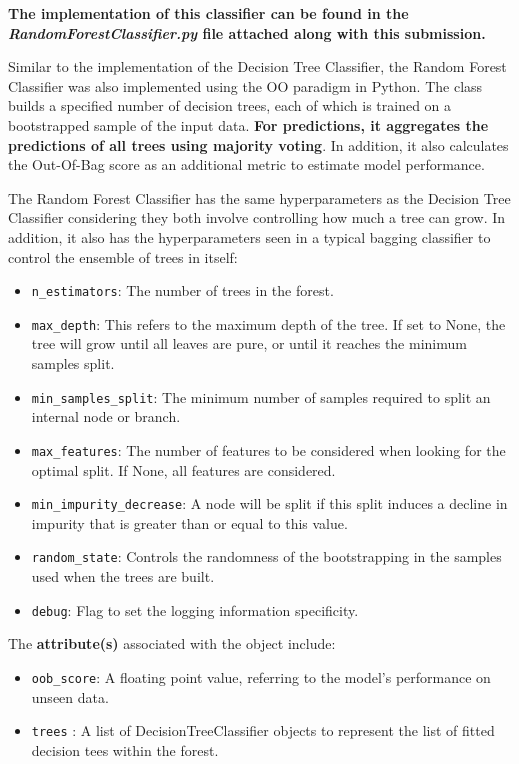 \begin{appendices}
  \textbf{The implementation of this classifier can be found in the \textit{RandomForestClassifier.py} file attached along with this submission.}

  Similar to the implementation of the Decision Tree Classifier, the Random Forest Classifier was also implemented using the OO paradigm in Python. The class builds a specified number of decision trees, each of which is trained on a bootstrapped sample of the input data.
  \textbf{For predictions, it aggregates the predictions of all trees using majority voting}.
  In addition, it also calculates the Out-Of-Bag score as an additional metric to estimate model performance.

  The Random Forest Classifier has the same hyperparameters as the Decision Tree Classifier considering they both involve controlling how much a tree can grow. In addition, it also has the hyperparameters seen in a typical bagging classifier to control the ensemble of trees in itself:
  \begin{itemize}
    \item \texttt{n\_estimators}: The number of trees in the forest.
    \item \texttt{max\_depth}: This refers to the maximum depth of the tree. If set to None, the tree will grow until all leaves are pure, or until it reaches the minimum samples split.
    \item \texttt{min\_samples\_split}: The minimum number of samples required to split an internal node or branch.
    \item \texttt{max\_features}: The number of features to be considered when looking for the optimal split. If None, all features are considered.
    \item \texttt{min\_impurity\_decrease}: A node will be split if this split induces a decline in impurity that is greater than or equal to this value.
    \item \texttt{random\_state}: Controls the randomness of the bootstrapping in the samples used when the trees are built.
    \item \texttt{debug}: Flag to set the logging information specificity.
  \end{itemize}

  The \textbf{attribute(s)} associated with the object include:
  \begin{itemize}
    \item \texttt{oob\_score}: A floating point value, referring to the model's performance on unseen data.
    \item \texttt{trees} : A list of DecisionTreeClassifier objects to represent the list of fitted decision tees within the forest.
  \end{itemize}


\end{appendices}
